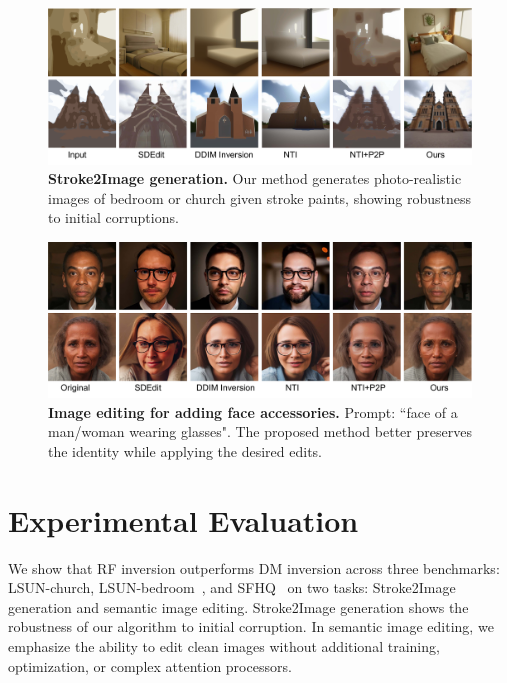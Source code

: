 \documentclass{article} %
\theoremstyle{plain}
\begin{document}
\begin{figure}[!t]
    \vspace{-1ex}
    \includegraphics[width=\linewidth]{pics/stroke2image-small_low.pdf}
    \vspace{-3ex}
    \caption{
    \textbf{Stroke2Image generation.} 
    Our method generates photo-realistic images of bedroom or church given stroke paints, showing robustness to initial corruptions.
    }
    \label{fig:stroke2image}
    \vspace{-1ex}  
\end{figure}



\begin{figure}[!t]
    \vspace{-1ex}
    \includegraphics[width=\linewidth]{pics/glass-edit-small_low.pdf}
    \vspace{-4ex}
    \caption{
    \textbf{Image editing for adding face accessories.} 
     Prompt: ``face of a man/woman wearing glasses".
     The proposed method better preserves the identity while applying the desired edits.
     \vspace{-3ex}
    }
    \label{fig:glass-edit}
    \vspace{-1ex}
\end{figure}



\section{Experimental Evaluation}
\label{sec:exps}
\vspace{-1ex}
We show that RF inversion outperforms DM inversion across three benchmarks: LSUN-church, LSUN-bedroom~\citep{lsun}, and SFHQ~\citep{sfhq} on two tasks: Stroke2Image generation and semantic image editing.
Stroke2Image generation shows the robustness of our algorithm to initial corruption.
In semantic image editing, we emphasize the ability to edit clean images without additional training, optimization, or complex attention processors.
\end{document}
